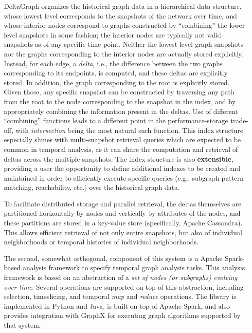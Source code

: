 \documentclass{svjour3}
\begin{document}
\vspace{2mm}
 DeltaGraph organizes the historical graph data in a hierarchical data structure, whose lowest level corresponds
to the snapshots of the network over time, and whose interior nodes correspond to graphs constructed by ``combining''
the lower level snapshots in some fashion; the interior nodes are typically not valid snapshots as of any specific time point. Neither the lowest-level
graph snapshots nor the graphs corresponding to the interior nodes are actually stored explicitly. Instead, for each edge, a {\em delta}, i.e., the
difference between the two graphs corresponding to its endpoints, is computed, and these deltas are explicitly stored. In addition, the graph
corresponding to the root is explicitly stored. Given those, any specific snapshot can be constructed by traversing any
path from the root to the node corresponding to the snapshot in the index, and by appropriately combining the information present in the deltas.
Use of different ``combining'' functions leads to a different point in the performance-storage trade-off, with {\em intersection} being the most
natural such function.  This index structure especially shines with multi-snapshot retrieval queries which are expected to be common in temporal 
analysis, as it can share the computation and retrieval of deltas across the multiple snapshots.
The index structure is also {\bf extensible}, providing a user the opportunity to define additional 
indexes to be created and maintained in order to efficiently execute specific queries (e.g., subgraph pattern matching, reachability, etc.)
    over the historical graph data.

To facilitate distributed storage and parallel retrieval, the deltas themselves are partitioned horizontally by nodes and vertically by attributes 
of the nodes, and these partitions are stored in a key-value store (specifically, Apache Cassandra). This allows efficient retrieval of not only
entire snapshots, but also of individual neighborhoods or temporal histories of individual neighborhoods.

\vspace{2mm}
 The second, somewhat orthogonal, component of this system is a Apache Spark-based analysis
framework to specify temporal graph analysis tasks. This analysis framework is based on an abstraction of a \textit{set of nodes 
(or subgraphs) evolving over time}. Several operations are supported on top of this abstraction, including selection, timeslicing, and
temporal {\em map} and {\em reduce} operations. The library is implemented in Python and Java, is built on top of Apache Spark, and also provides
integration with GraphX for executing graph algorithms supported by that system.
\end{document}
